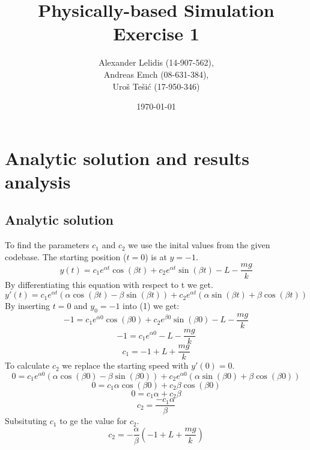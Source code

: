 \documentclass{article}
\title{Physically-based Simulation \\ Exercise 1}
\author{ 
    Alexander Lelidis (14-907-562), \\
    Andreas Emch (08-631-384), \\
    Uro\v{s} Te\v{s}i\'{c} (17-950-346)
}
\date{\today}
\begin{document}
\maketitle

\section{Analytic solution and results analysis}
\subsection{Analytic solution}
To find the parameters $c_1$ and $c_2$ we use the inital values from the given codebase. The starting position ($t = 0$) is at $y = -1$.
\begin{equation}
    y(t) = c_1 e^{\alpha  t} \cos(\beta t) + c_2 e^{\alpha  t} \sin(\beta t) - L - \frac{mg}{k}
\end{equation}
By  differentiating this equation with respect to t we get.
\begin{equation}
    y'(t) = c_1 e^{\alpha  t} (\alpha \cos(\beta t) - \beta \sin(\beta t) )+ c_2 e^{\alpha  t} (\alpha \sin(\beta t) + \beta \cos(\beta t)) 
\end{equation}
By inserting $t = 0$ and $y_0 = -1$ into (1) we get:
\begin{equation}
    -1 = c_1 e^{\alpha  0} \cos(\beta 0) + c_2 e^{\beta  0} \sin(\beta 0) - L - \frac{mg}{k} 
\end{equation}
\begin{equation}
    -1 = c_1 e^{\alpha  0} - L - \frac{mg}{k} 
\end{equation}
\begin{equation}
    c_1 = -1 + L + \frac{mg}{k}
\end{equation}
To calculate $c_2$ we replace the starting speed with $y'(0) = 0$.
\begin{equation}
    0 = c_1 e^{\alpha  0} (\alpha \cos(\beta 0) - \beta \sin(\beta 0) )+ c_2 e^{\alpha  0} (\alpha \sin(\beta 0) + \beta \cos(\beta 0)) 
\end{equation}
\begin{equation}
    0 = c_1 \alpha \cos(\beta 0) + c_2  \beta \cos(\beta 0)
\end{equation}
\begin{equation}
    0 = c_1 \alpha + c_2  \beta
\end{equation}
\begin{equation}
    c_2 =  \frac{- c_1 \alpha}{  \beta}
\end{equation}
Subsituting $c_1$ to ge the value for $c_2$.
\begin{equation}
    c_2 =  - \frac{ \alpha}{  \beta} (-1 + L + \frac{mg}{k})
\end{equation}
\end{document}
